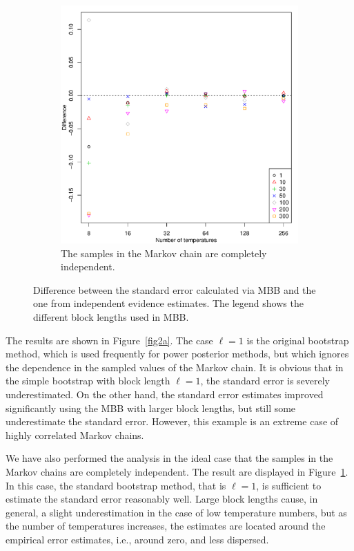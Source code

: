 \documentclass[aps,reprint,amsmath,amssymb,showpacs,showkeys]{revtex4-1}%
\begin{document}
\begin{figure}[]
\begin{subfigure}{0.50\textwidth}
	\includegraphics[scale=0.45,clip=true,angle=0]{ErrorEstimates_IndMC.pdf}
	\caption{The samples in the Markov chain are completely independent.}
	\label{fig2b}
	\end{subfigure}
	\caption{Difference between the standard error calculated via MBB and the one from independent evidence estimates.  The legend shows the different block lengths used in MBB.}
	\label{fig2}
\end{figure}

The results are shown in Figure~\ref{fig2a}.  The case $\ell = 1$ is the original bootstrap method, which is used frequently for power posterior methods, but which ignores the dependence in the sampled values of the Markov chain.  It is obvious that in the simple bootstrap with block length $\ell=1$, the standard error is severely underestimated. On the other hand, the standard error estimates  improved significantly using 
the MBB with larger block lengths, but still some underestimate  the standard error.  However, this example is an extreme case of highly correlated Markov chains.  

We have also performed the analysis in the ideal case that the samples in the Markov chains are completely independent.  The result are displayed in Figure~\ref{fig2b}.  In this case, the standard bootstrap method, that is $\ell = 1$, is sufficient to estimate the standard error reasonably well. Large block lengths cause, in general, a slight underestimation in the case of low temperature numbers, but as the number of temperatures increases, the estimates are located around the empirical error estimates, i.e., around zero, and less dispersed.
\end{document}
